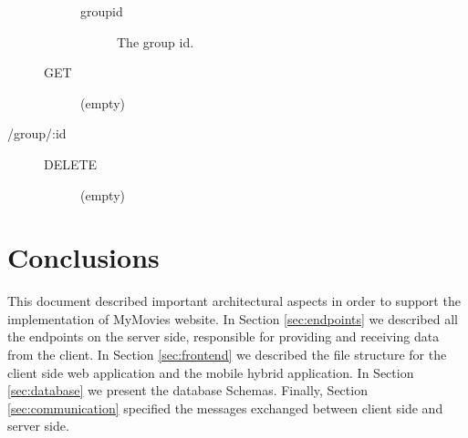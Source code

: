 \begin{description}
\begin{description}
\begin{description}
          \item [groupid] The group id.
        \end{description}
      \item [GET] \hfill
        \begin{description}
          \item [(empty)]
        \end{description}
    \end{description}
  \item [/group/:id] \hfill
    \begin{description}
      \item [DELETE] \hfill
        \begin{description}
          \item [(empty)]
        \end{description}
    \end{description}
\end{description}

\section{Conclusions}

This document described important architectural aspects in order to support the
implementation of MyMovies website. In Section \ref{sec:endpoints} we described
all the endpoints on the server side, responsible for providing and receiving
data from the client. In Section \ref{sec:frontend} we described the file
structure for the client side web application and the mobile hybrid
application. In Section \ref{sec:database} we present the database Schemas.
Finally, Section \ref{sec:communication} specified the messages exchanged
between client side and server side.





